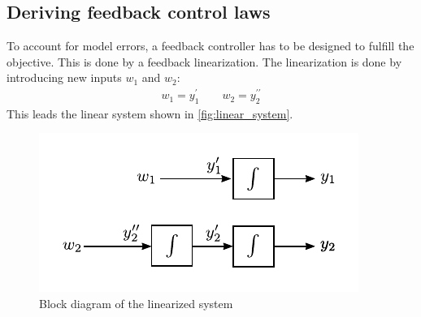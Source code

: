 \documentclass[a4paper,11pt,headings=standardclasses,parskip=half]{scrartcl}
\begin{document}
\subsection{Deriving feedback control laws}
To account for model errors, a feedback controller has to be designed to fulfill the objective. This is done by a feedback linearization.
The linearization is done by introducing new inputs $w_1$ and $w_2$:
\begin{align}
\label{eq:new_inputs}
w_1 = y_1^\prime \qquad w_2 = y_2^{\prime\prime}
\end{align}
This leads the linear system shown in \autoref{fig:linear_system}. 
\begin{figure}[ht]
\centering
\includegraphics[scale=1]{img/linear_system.pdf}
\caption{Block diagram of the linearized system}
\label{fig:linear_system}
\end{figure}
\end{document}
